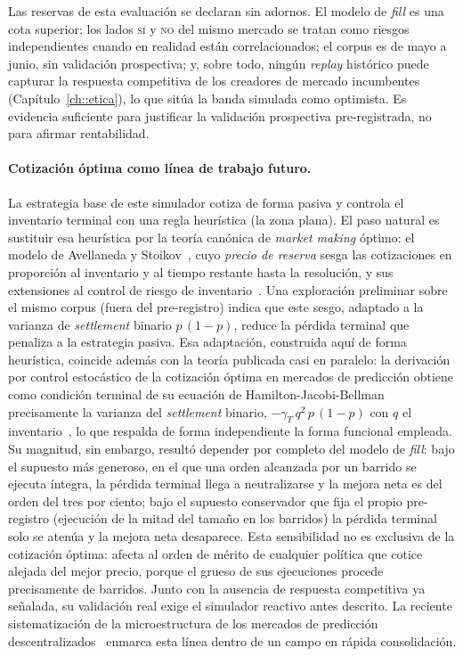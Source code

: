 Las reservas de esta evaluación se declaran sin adornos. El modelo de \emph{fill} es una
cota superior; los lados \textsc{sí} y \textsc{no} del mismo mercado se tratan como riesgos
independientes cuando en realidad están correlacionados; el corpus es de mayo a junio, sin
validación prospectiva; y, sobre todo, ningún \emph{replay} histórico puede capturar la
respuesta competitiva de los creadores de mercado incumbentes
(Capítulo~\ref{ch::etica}), lo que sitúa la banda simulada como optimista. Es evidencia
suficiente para justificar la validación prospectiva pre-registrada, no para afirmar
rentabilidad.

\paragraph{Cotización óptima como línea de trabajo futuro.} La estrategia base de este
simulador cotiza de forma pasiva y controla el inventario terminal con una regla
heurística (la zona plana). El paso natural es sustituir esa heurística por la teoría
canónica de \emph{market making} óptimo: el modelo de Avellaneda y
Stoikov~\cite{avellaneda2008}, cuyo \emph{precio de reserva} sesga las cotizaciones en
proporción al inventario y al tiempo restante hasta la resolución, y sus extensiones al
control de riesgo de inventario~\cite{gueant2013}. Una exploración preliminar sobre el
mismo corpus (fuera del pre-registro) indica que este sesgo, adaptado a la varianza de
\emph{settlement} binario $p\,(1-p)$, reduce la pérdida terminal que penaliza a la
estrategia pasiva. Esa adaptación, construida aquí de forma heurística, coincide además
con la teoría publicada casi en paralelo: la derivación por control estocástico de la
cotización óptima en mercados de predicción obtiene como condición terminal de su
ecuación de Hamilton-Jacobi-Bellman precisamente la varianza del \emph{settlement}
binario, $-\gamma_T\,q^2\,p\,(1-p)$ con $q$ el inventario~\cite{feil2026optimal}, lo que
respalda de forma independiente la forma funcional empleada. Su magnitud, sin embargo, resultó depender por completo del modelo de
\emph{fill}: bajo el supuesto más generoso, en el que una orden alcanzada por un barrido
se ejecuta íntegra, la pérdida terminal llega a neutralizarse y la mejora neta es del
orden del tres por ciento; bajo el supuesto conservador que fija el propio pre-registro
(ejecución de la mitad del tamaño en los barridos) la pérdida terminal solo se atenúa y
la mejora neta desaparece. Esta sensibilidad no es exclusiva de la cotización óptima:
afecta al orden de mérito de cualquier política que cotice alejada del mejor precio,
porque el grueso de sus ejecuciones procede precisamente de barridos. Junto con la
ausencia de respuesta competitiva ya señalada, su validación real exige el simulador
reactivo antes descrito. La reciente
sistematización de la microestructura de los mercados de predicción
descentralizados~\cite{rahman2026sok} enmarca esta línea dentro de un campo en rápida
consolidación.


